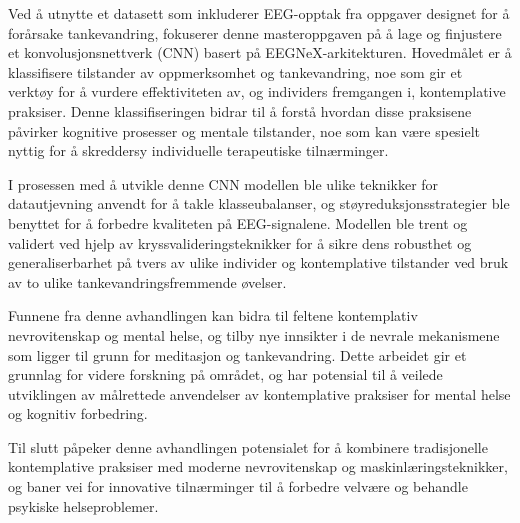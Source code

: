 Ved å utnytte et datasett som inkluderer EEG-opptak fra oppgaver designet for å forårsake tankevandring, fokuserer denne masteroppgaven på å lage og finjustere et konvolusjonsnettverk (CNN) basert på EEGNeX-arkitekturen. Hovedmålet er å klassifisere tilstander av oppmerksomhet og tankevandring, noe som gir et verktøy for å vurdere effektiviteten av, og individers fremgangen i, kontemplative praksiser. Denne klassifiseringen bidrar til å forstå hvordan disse praksisene påvirker kognitive prosesser og mentale tilstander, noe som kan være spesielt nyttig for å skreddersy individuelle terapeutiske tilnærminger.

I prosessen med å utvikle denne CNN modellen ble ulike teknikker for datautjevning anvendt for å takle klasseubalanser, og støyreduksjonsstrategier ble benyttet for å forbedre kvaliteten på EEG-signalene. Modellen ble trent og validert ved hjelp av kryssvalideringsteknikker for å sikre dens robusthet og generaliserbarhet på tvers av ulike individer og kontemplative tilstander ved bruk av to ulike tankevandringsfremmende øvelser.

Funnene fra denne avhandlingen kan bidra  til feltene kontemplativ nevrovitenskap og mental helse, og tilby nye innsikter i de nevrale mekanismene som ligger til grunn for meditasjon og tankevandring. Dette arbeidet gir et grunnlag for videre forskning på området, og har potensial til å veilede utviklingen av målrettede anvendelser av kontemplative praksiser for mental helse og kognitiv forbedring.

Til slutt påpeker denne avhandlingen potensialet for å kombinere tradisjonelle kontemplative praksiser med moderne nevrovitenskap og maskinlæringsteknikker, og baner vei for innovative tilnærminger til å forbedre velvære og behandle psykiske helseproblemer.





